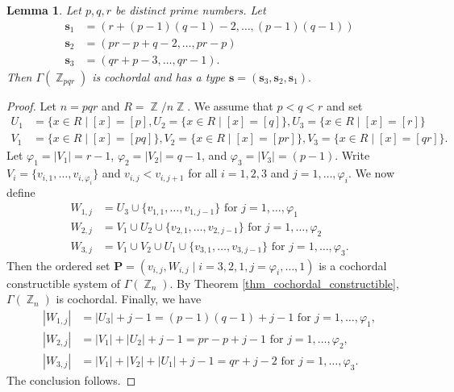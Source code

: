 \documentclass[12pt,amscd]{amsart}
\newtheorem{lem}[thm]{Lemma}
\theoremstyle{definition}
\numberwithin{equation}{section}
\DeclareMathOperator{\ZZ}{\mathbb {Z}}
\def\P {\mathbf P}
\def\s {\mathbf s}
\begin{document}
\begin{lem}\label{lem_cochord_zero_div_3} Let $p,q,r$ be distinct prime numbers. Let 
\begin{align*}
    \s_1 & = (r + (p-1)(q-1) -2, \ldots, (p-1)(q-1)) \\
    \s_2 & = (pr - p +q - 2, \ldots, pr - p) \\
    \s_3 & = (qr +p - 3, \ldots, qr - 1).
\end{align*}
Then $\Gamma(\ZZ_{pqr})$ is cochordal and has a type $\s = (\s_3, \s_2, \s_1).$
\end{lem}
\begin{proof} Let $n = pqr$ and $R = \ZZ/n \ZZ$. We assume that $p < q <r$ and set 
\begin{align*}
U_1 &= \{x \in R\mid [x] = [p], U_2 = \{x \in R \mid [x] = [q] \}, U_3 = \{x \in R \mid [x] = [r]\}\\
V_1 &= \{x\in R \mid [x] = [pq]\}, V_2 = \{x \in R \mid [x] = [pr]\}, V_3 = \{x \in R \mid [x] = [qr]\}.
\end{align*}
Let $\varphi_1 = |V_1| = r-1$, $\varphi_2 = |V_2| = q-1$, and $\varphi_3 = |V_3| = (p-1)$. Write $V_i = \{v_{i,1}, \ldots, v_{i,\varphi_i}\}$ and $v_{i,j} < v_{i,j+1}$ for all $i=1, 2,3$ and $j = 1, \ldots, \varphi_i$. We now define 
    \begin{align*}
        W_{1,j} & = U_{3} \cup  \{ v_{1,1}, \ldots, v_{1,j-1} \} \text{ for } j = 1, \ldots, \varphi_1\\
        W_{2,j} & = V_1 \cup U_2 \cup \{ v_{2,1},\ldots,v_{2,j-1} \} \text{ for } j=1, \ldots, \varphi_2 \\
        W_{3,j} & = V_1 \cup V_2 \cup U_1 \cup \{v_{3,1}, \ldots, v_{3,j-1} \} \text{ for } j = 1, \ldots, \varphi_3. 
    \end{align*}
    Then the ordered set $\P = (v_{i,j},W_{i,j} \mid i = 3, 2, 1, j = \varphi_i, \ldots, 1)$ is a cochordal constructible system of $\Gamma(\ZZ_n)$. By Theorem \ref{thm_cochordal_constructible}, $\Gamma(\ZZ_n)$ is cochordal. Finally, we have 
    \begin{align*}
        |W_{1,j}| & = |U_{3}| + j-1 = (p-1)(q-1) + j -1 \text{ for } j = 1, \ldots, \varphi_1,\\
        |W_{2,j}| & = |V_1| + |U_2| + j - 1 = pr -p +j-1 \text{ for } j = 1, \ldots, \varphi_2,\\
        |W_{3,j}| & = |V_1| + |V_2| + |U_1|  + j -1 = qr + j -2 \text{ for } j = 1, \ldots, \varphi_3.
    \end{align*}
    The conclusion follows.
\end{proof}
\end{document}
